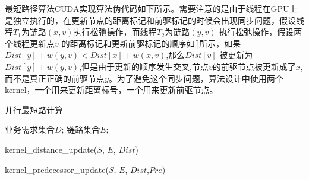   最短路径算法CUDA实现算法伪代码如下所示。需要注意的是由于线程在GPU上是独立执行的，在更新节点的距离标记和前驱标记的时候会出现同步问题，假设线程$T_1$为链路$(x,v)$执行松弛操作，而线程$T_2$为链路$(y,v)$ 执行松弛操作，假设两个线程更新点$v$ 的距离标记和更新前驱标记的顺序如[]所示，如果$Dist[y] + w(y, v) < Dist[x] +w(x, v)$,那么$Dist[v]$ 被更新为$Dist[y] + w(y, v)$,但是由于更新的顺序发生交叉,节点$v$的前驱节点被更新成了$x$, 而不是真正正确的前驱节点$y$。为了避免这个同步问题，算法设计中使用两个kernel，一个用来更新距离标号，一个用来更新前驱节点。
\begin{algorithm}[t]
\begin{algorithmic}[1]
\caption{{并行最短路计算}}
\label{ParaSPC}
\Require
	 业务需求集合$D$;
      链路集合$E$;
\EndWhile
\end{algorithmic}
\end{algorithm}

\begin{algorithm}[t]
\begin{algorithmic}[1]
\caption{\small{kernel\_distance\_update($S$, $E$, $Dist$)}}
\label{KernelDist}
\EndIf
\Return
\end{algorithmic}
\end{algorithm}

\begin{algorithm}[t]
\begin{algorithmic}[1]
\caption{{kernel\_predecessor\_update($S$, $E$, $Dist$,$Pre$)}}
\label{KernelPre}
\EndIf
\Return
\end{algorithmic}
\end{algorithm}

